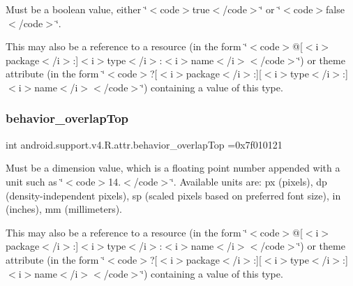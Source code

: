 Must be a boolean value, either \char`\"{}$<$code$>$true$<$/code$>$\char`\"{} or \char`\"{}$<$code$>$false$<$/code$>$\char`\"{}. 

This may also be a reference to a resource (in the form \char`\"{}$<$code$>$@\mbox{[}$<$i$>$package$<$/i$>$\+:\mbox{]}$<$i$>$type$<$/i$>$\+:$<$i$>$name$<$/i$>$$<$/code$>$\char`\"{}) or theme attribute (in the form \char`\"{}$<$code$>$?\mbox{[}$<$i$>$package$<$/i$>$\+:\mbox{]}\mbox{[}$<$i$>$type$<$/i$>$\+:\mbox{]}$<$i$>$name$<$/i$>$$<$/code$>$\char`\"{}) containing a value of this type. \mbox{\label{classandroid_1_1support_1_1v4_1_1R_1_1attr_a9c99f83bd4153ed9af5740d4a4cf48dc}} 
\subsubsection{\texorpdfstring{behavior\+\_\+overlap\+Top}{behavior\_overlapTop}}
{\footnotesize\ttfamily int android.\+support.\+v4.\+R.\+attr.\+behavior\+\_\+overlap\+Top =0x7f010121\hspace{0.3cm}{\ttfamily [static]}}

Must be a dimension value, which is a floating point number appended with a unit such as \char`\"{}$<$code$>$14.\+5sp$<$/code$>$\char`\"{}. Available units are\+: px (pixels), dp (density-\/independent pixels), sp (scaled pixels based on preferred font size), in (inches), mm (millimeters). 

This may also be a reference to a resource (in the form \char`\"{}$<$code$>$@\mbox{[}$<$i$>$package$<$/i$>$\+:\mbox{]}$<$i$>$type$<$/i$>$\+:$<$i$>$name$<$/i$>$$<$/code$>$\char`\"{}) or theme attribute (in the form \char`\"{}$<$code$>$?\mbox{[}$<$i$>$package$<$/i$>$\+:\mbox{]}\mbox{[}$<$i$>$type$<$/i$>$\+:\mbox{]}$<$i$>$name$<$/i$>$$<$/code$>$\char`\"{}) containing a value of this type. \mbox{\label{classandroid_1_1support_1_1v4_1_1R_1_1attr_a410f0e475e0b8e5e57b221d907504857}} 
